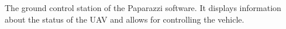 The ground control station of the Paparazzi software. It displays information about the status of the UAV and allows for controlling the vehicle.
